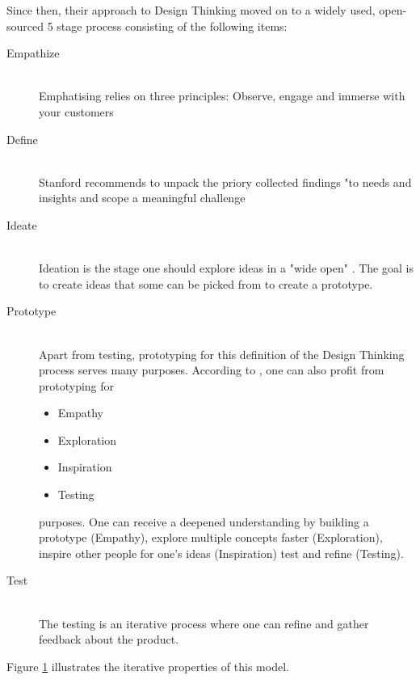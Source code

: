 Since then, their approach to Design Thinking moved on to a widely used, open-sourced 5 stage process \parencite{designThinkingCrashCourse}
consisting of the following items:
\begin{description}
    \item [Empathize] \hfill \\
    Emphatising relies on three principles: Observe, engage and immerse with your customers
    \item [Define] \hfill \\
    Stanford recommends to unpack the priory collected findings "to needs and insights and scope a meaningful challenge \parencite{designThinkingBootleg}
    \item [Ideate] \hfill \\
    Ideation is the stage one should explore ideas in a "wide open" \parencite{designThinkingBootleg}. The goal is to create ideas that some 
    can be picked from to create a prototype.
    \item [Prototype] \hfill \\
    Apart from testing, prototyping for this definition of the Design Thinking process serves many purposes. 
    According to \parencite{designThinkingBootleg}, one can also profit from prototyping for
    \begin{itemize}
        \item Empathy
        \item Exploration
        \item Inspiration
        \item Testing
    \end{itemize}
    purposes. One can receive a deepened understanding by building a prototype (Empathy), explore multiple concepts faster (Exploration),
    inspire other people for one's ideas (Inspiration) test and refine (Testing). 

    \item [Test] \hfill \\
    The testing is an iterative process where one can refine and gather feedback about the product.
\end{description}
Figure \ref{fig:designThinking} illustrates the iterative properties of this model.

\begin{figure}[h]
	\centering
	\caption[designThinking]{}
	\label{fig:designThinking}
  \end{figure}

